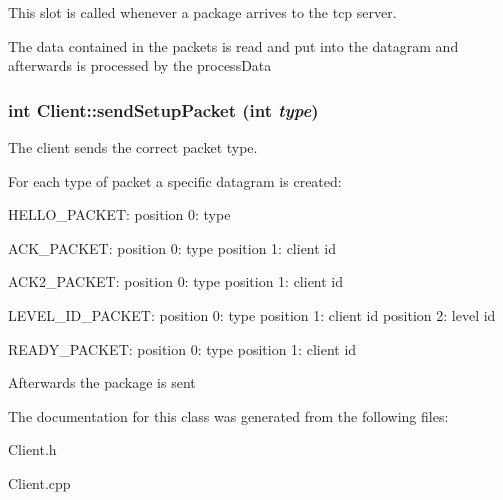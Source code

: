 This slot is called whenever a package arrives to the tcp server. 

The data contained in the packets is read and put into the datagram and afterwards is processed by the processData \hypertarget{classClient_a2194fd34125d24363c4e7074ec3923b3}{
\subsubsection[{sendSetupPacket}]{\setlength{\rightskip}{0pt plus 5cm}int Client::sendSetupPacket (int {\em type})}}
\label{classClient_a2194fd34125d24363c4e7074ec3923b3}


The client sends the correct packet type. 

For each type of packet a specific datagram is created:


\begin{DoxyItemize}
\item HELLO\_\-PACKET: position 0: type
\end{DoxyItemize}


\begin{DoxyItemize}
\item ACK\_\-PACKET: position 0: type position 1: client id
\end{DoxyItemize}


\begin{DoxyItemize}
\item ACK2\_\-PACKET: position 0: type position 1: client id
\end{DoxyItemize}


\begin{DoxyItemize}
\item LEVEL\_\-ID\_\-PACKET: position 0: type position 1: client id position 2: level id
\end{DoxyItemize}


\begin{DoxyItemize}
\item READY\_\-PACKET: position 0: type position 1: client id
\end{DoxyItemize}

Afterwards the package is sent 

The documentation for this class was generated from the following files:\begin{DoxyCompactItemize}
\item 
Client.h\item 
Client.cpp\end{DoxyCompactItemize}
